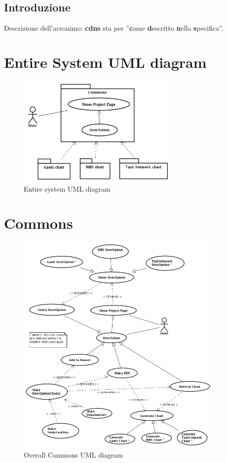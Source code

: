 \documentclass[a4paper, 12pt]{report}
\begin{document}
\newpage

\section*{Introduzione}
Descrizione dell'acronimo: \textbf{cdns} sta per ''\textbf{c}ome
\textbf{d}escritto \textbf{n}ella \textbf{s}pecifica''.

\chapter*{Entire System UML diagram}
\begin{figure}[h!] \centering
\includegraphics[width=0.7\textwidth]{EntireSystem.png} 
\caption{Entire system UML diagram}
\label{fig:entireSystemDiagram}
\end{figure}

\chapter{Commons}
\begin{figure}[h!] \centering
\includegraphics[width=0.9\textwidth]{Commons/img/Overall.png} 
\caption{Overall Commons UML diagram}
\label{fig:commonsOverallDiagram}
\end{figure}
\end{document}

